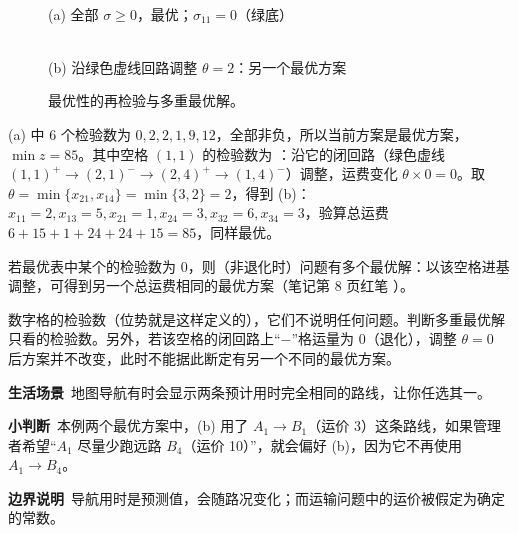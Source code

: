 \begin{figure}[H]
\centering
\begin{minipage}{0.5\linewidth}\centering
{}\\{\small (a) 全部 $\sigma\ge0$，最优；$\sigma_{11}=0$（绿底）}
\end{minipage}\hfill
\begin{minipage}{0.46\linewidth}\centering
{}\\{\small (b) 沿绿色虚线回路调整 $\theta=2$：另一个最优方案}
\end{minipage}
\caption{最优性的再检验与多重最优解。}\label{fig:multi}
\end{figure}
(a) 中 6 个检验数为 $0,2,2,1,9,12$，全部非负，所以当前方案是最优方案，$\min z=85$。其中空格 $(1,1)$ 的检验数为 ：沿它的闭回路（绿色虚线 $(1,1)^+\to(2,1)^-\to(2,4)^+\to(1,4)^-$）调整，运费变化 $\theta\times0=0$。取 $\theta=\min\{x_{21},x_{14}\}=\min\{3,2\}=2$，得到 (b)：$x_{11}=2,x_{13}=5,x_{21}=1,x_{24}=3,x_{32}=6,x_{34}=3$，验算总运费 $6+15+1+24+24+15=85$，同样最优。

\begin{theorembox}[多重最优解]
若最优表中某个的检验数为 0，则（非退化时）问题有多个最优解：以该空格进基调整，可得到另一个总运费相同的最优方案（笔记第 8 页红笔 \orig）。
\end{theorembox}
\begin{warningbox}[“$\sigma=0$”出现在哪里]
数字格的检验数（位势就是这样定义的），它们不说明任何问题。判断多重最优解只看的检验数。另外，若该空格的闭回路上“$-$”格运量为 0（退化），调整 $\theta=0$ 后方案并不改变，此时不能据此断定有另一个不同的最优方案。
\end{warningbox}
\begin{lifebox}
\textbf{生活场景}\ 地图导航有时会显示两条预计用时完全相同的路线，让你任选其一。\par
{}
\textbf{小判断}\ 本例两个最优方案中，(b) 用了 $A_1\to B_1$（运价 3）这条路线，如果管理者希望“$A_1$ 尽量少跑远路 $B_4$（运价 10）”，就会偏好 (b)，因为它不再使用 $A_1\to B_4$。\par
\textbf{边界说明}\ 导航用时是预测值，会随路况变化；而运输问题中的运价被假定为确定的常数。
\end{lifebox}

